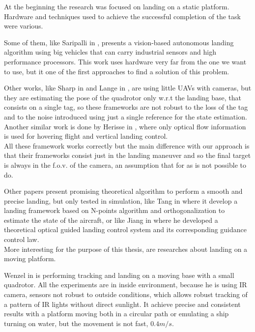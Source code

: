 At the beginning the research was focused on landing on a static platform. \\
Hardware and techniques used to achieve the successful completion of the task were various.

Some of them, like Saripalli in \cite{saripalli2002vision}, presents a vision-based autonomous landing algorithm using big vehicles that can carry industrial sensors and high performance processors. This work uses hardware very far from the one we want to use, but it one of the first approaches to find a solution of this problem.

Other works, like Sharp in \cite{sharp2001vision} and Lange in \cite{lange2008autonomous}, are using little UAVs with cameras, but they are estimating the pose of the quadrotor only w.r.t the landing base, that consists on a single tag, so these frameworks are not robust to the loss of the tag and to the noise introduced using just a single reference for the state estimation.\\ 
Another similar work is done by Herisse in \cite{herisse2008hovering}, where only optical flow information is used for hovering flight and vertical landing control.\\
All these framework works correctly but the main difference with our approach is that their frameworks consist just in the landing maneuver and so the final target is always in the f.o.v. of the camera, an assumption that for as is not possible to do.

Other papers present promising theoretical algorithm to perform a smooth and precise landing, but only tested in simulation, like Tang in \cite{tang2011uav} where it develop a landing framework based on N-points algorithm and orthogonalization to estimate the state of the aircraft, or like Jiang in \cite{jian2012automatic} where he developed a theoretical optical guided landing control system and its corresponding guidance control law.\\



More interesting for the purpose of this thesis, are researches about landing on a moving platform.

Wenzel in \cite{wenzel2011automatic} is performing tracking and landing on a moving base with a small quadrotor. All the experiments are in inside environment, because he is using IR camera, sensors not robust to outside conditions, which allows robust tracking of a pattern of IR lights without direct sunlight. It achieve precise and consistent results with a platform moving both in a circular path or emulating a ship turning on water, but the movement is not fast, $0.4m/s$.

